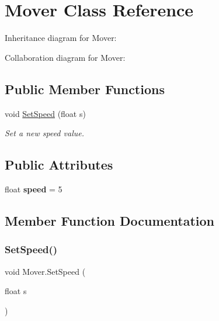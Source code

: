 \hypertarget{class_mover}{}\section{Mover Class Reference}
\label{class_mover}


Inheritance diagram for Mover\+:


Collaboration diagram for Mover\+:
\subsection*{Public Member Functions}
\begin{DoxyCompactItemize}
\item 
void \mbox{\hyperlink{class_mover_a7a75a74f9bf6f20d3938c37bb95d8068}{Set\+Speed}} (float s)
\begin{DoxyCompactList}\small\item\em Set a new speed value. \end{DoxyCompactList}\end{DoxyCompactItemize}
\subsection*{Public Attributes}
\begin{DoxyCompactItemize}
\item 
\mbox{\label{class_mover_a42234f06ee744991fac244af8fc526b9}} 
float {\bfseries speed} = 5
\end{DoxyCompactItemize}


\subsection{Member Function Documentation}
\mbox{\label{class_mover_a7a75a74f9bf6f20d3938c37bb95d8068}} 
\subsubsection{\texorpdfstring{Set\+Speed()}{SetSpeed()}}
{\footnotesize\ttfamily void Mover.\+Set\+Speed (\begin{DoxyParamCaption}\item[{float}]{s }\end{DoxyParamCaption})}



